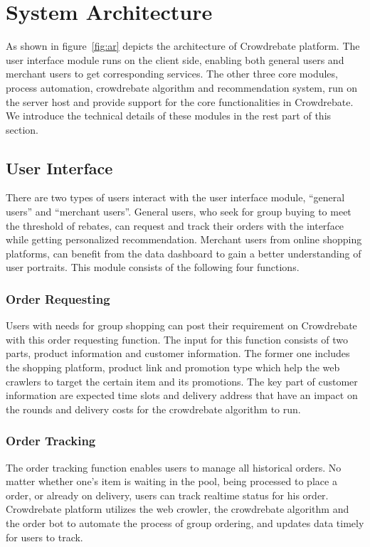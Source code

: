 \section{System Architecture}

As shown in figure~\ref{fig:ar} depicts the architecture of Crowdrebate platform. The user interface module runs on the client side, enabling both general users and merchant users to get corresponding services. The other three core modules, process automation, crowdrebate algorithm and recommendation system, run on the server host and provide support for the core functionalities in Crowdrebate. We introduce the technical details of these modules in the rest part of this section.

\subsection{User Interface}

There are two types of users interact with the user interface module, ``general users'' and ``merchant users''. General users, who seek for group buying to meet the threshold of rebates, can request and track their orders with the interface while getting personalized recommendation. Merchant users from online shopping platforms, can benefit from the data dashboard to gain a better understanding of user portraits. This module consists of the following four functions.

\subsubsection{Order Requesting}

Users with needs for group shopping can post their requirement on Crowdrebate with this order requesting function. The input for this function consists of two parts, product information and customer information. The former one includes the shopping platform, product link and promotion type which help the web crawlers to target the certain item and its promotions. The key part of customer information are expected time slots and delivery address that have an impact on the rounds and delivery costs for the crowdrebate algorithm to run.

\subsubsection{Order Tracking}

The order tracking function enables users to manage all historical orders. No matter whether one's item is waiting in the pool, being processed to place a order, or already on delivery, users can track realtime status for his order. Crowdrebate platform utilizes the web crowler, the crowdrebate algorithm and the order bot to automate the process of group ordering, and updates data timely for users to track.
	
